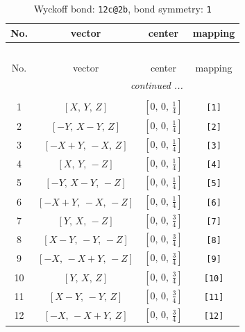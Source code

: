 \documentclass[fleqn,8pt]{jsarticle}
\begin{document}
\renewcommand{\arraystretch}{1.2}
\begin{longtable}{cccc}
\caption{Wyckoff bond: {\tt 12c@2b}, bond symmetry: {\tt 1}}
 \\
 \hline \hline
No. & vector & center & mapping \\ \hline \endfirsthead

\multicolumn{3}{l}{\tablename\ \thetable{}} \\
 \hline \hline
No. & vector & center & mapping \\ \hline \endhead

 \hline \hline
\multicolumn{3}{r}{\footnotesize\it continued ...} \\ \endfoot

 \hline \hline
\multicolumn{3}{r}{} \\ \endlastfoot

1 & $\left[ X,\, Y,\, Z \right]$ & $\left[ 0,\, 0,\, \frac{1}{4} \right]$ & {\tt [1]} \\ \hline
2 & $\left[ - Y,\, X - Y,\, Z \right]$ & $\left[ 0,\, 0,\, \frac{1}{4} \right]$ & {\tt [2]} \\ \hline
3 & $\left[ - X + Y,\, - X,\, Z \right]$ & $\left[ 0,\, 0,\, \frac{1}{4} \right]$ & {\tt [3]} \\ \hline
4 & $\left[ X,\, Y,\, - Z \right]$ & $\left[ 0,\, 0,\, \frac{1}{4} \right]$ & {\tt [4]} \\ \hline
5 & $\left[ - Y,\, X - Y,\, - Z \right]$ & $\left[ 0,\, 0,\, \frac{1}{4} \right]$ & {\tt [5]} \\ \hline
6 & $\left[ - X + Y,\, - X,\, - Z \right]$ & $\left[ 0,\, 0,\, \frac{1}{4} \right]$ & {\tt [6]} \\ \hline
7 & $\left[ Y,\, X,\, - Z \right]$ & $\left[ 0,\, 0,\, \frac{3}{4} \right]$ & {\tt [7]} \\ \hline
8 & $\left[ X - Y,\, - Y,\, - Z \right]$ & $\left[ 0,\, 0,\, \frac{3}{4} \right]$ & {\tt [8]} \\ \hline
9 & $\left[ - X,\, - X + Y,\, - Z \right]$ & $\left[ 0,\, 0,\, \frac{3}{4} \right]$ & {\tt [9]} \\ \hline
10 & $\left[ Y,\, X,\, Z \right]$ & $\left[ 0,\, 0,\, \frac{3}{4} \right]$ & {\tt [10]} \\ \hline
11 & $\left[ X - Y,\, - Y,\, Z \right]$ & $\left[ 0,\, 0,\, \frac{3}{4} \right]$ & {\tt [11]} \\ \hline
12 & $\left[ - X,\, - X + Y,\, Z \right]$ & $\left[ 0,\, 0,\, \frac{3}{4} \right]$ & {\tt [12]} \\
\end{longtable}
\end{document}

